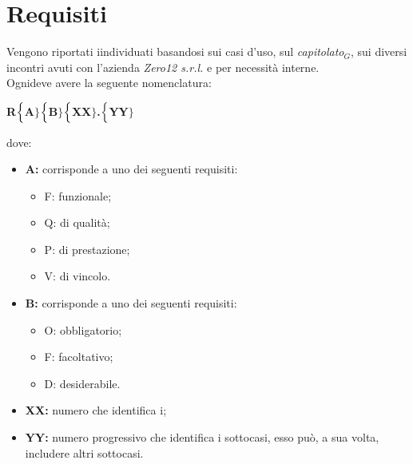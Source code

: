 \chapter{Requisiti} \label{Requisiti}
Vengono riportati iindividuati basandosi sui casi d'uso, sul \textit{capitolato$_{G}$}, sui diversi incontri avuti con l'azienda \textit{Zero12 s.r.l.} e per necessità interne. \\

Ognideve avere la seguente nomenclatura:
\begin{center}
	\textbf{R$\Bigl\{$A$\Bigr\}$$\Bigl\{$B$\Bigr\}$$\Bigl\{$XX$\Bigr\}$.$\Bigl\{$YY$\Bigr\}$}
\end{center}
dove:
\begin{itemize}
	\item \textbf{A:} corrisponde a uno dei seguenti requisiti:
	\begin{itemize}
		\item F: funzionale;
		\item Q: di qualità;
		\item P: di prestazione;
		\item V: di vincolo.
	\end{itemize}
	\item \textbf{B:} corrisponde a uno dei seguenti requisiti:
	\begin{itemize}
		\item O: obbligatorio;
		\item F: facoltativo;
		\item D: desiderabile.
	\end{itemize}
	\item \textbf{{XX}:} numero che identifica i;
	\item \textbf{{YY}:} numero progressivo che identifica i sottocasi, esso può, a sua volta, includere altri sottocasi.
\end{itemize}
\pagebreak
